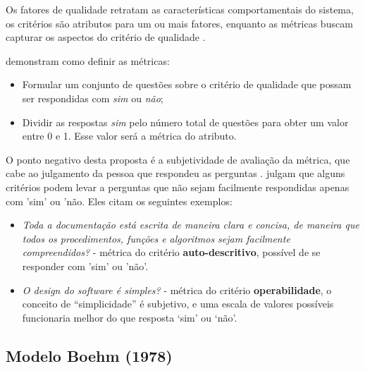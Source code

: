 \documentclass[
	12pt,				%
	openright,			%
	oneside,			%
	a4paper,			%
	english,			%
	brazil,				%
	]{abntex2}
\begin{document}
\begin{figure}[H]
    \label{fig:mcCall-quality_model}
\end{figure}

Os fatores de qualidade retratam as características comportamentais do sistema, os critérios são atributos para um ou mais fatores, enquanto as métricas buscam capturar os aspectos do critério de qualidade \cite{berander2005}.

 demonstram como definir as métricas:
\begin{itemize}
    \item Formular um conjunto de questões sobre o critério de qualidade que possam ser respondidas com \emph{sim} ou \emph{não};
    \item Dividir as respostas \emph{sim} pelo número total de questões para obter um valor entre 0 e 1. Esse valor será a métrica do atributo.
\end{itemize}

O ponto negativo desta proposta é a subjetividade de avaliação da métrica, que cabe ao julgamento da pessoa que respondeu as perguntas \cite{berander2005}.  julgam que alguns critérios podem levar a perguntas que não sejam facilmente respondidas apenas com 'sim' ou 'não. Eles citam os seguintes exemplos:
\begin{itemize}
    \item \emph{Toda a documentação está escrita de maneira clara e concisa, de maneira que todos os procedimentos, funções e algoritmos sejam facilmente compreendidos?} - métrica do critério \textbf{auto-descritivo}, possível de se responder com 'sim' ou 'não'.
    \item \emph{O design do software é simples?} - métrica do critério \textbf{operabilidade}, o conceito de ``simplicidade'' é subjetivo, e uma escala de valores possíveis funcionaria melhor do que resposta `sim' ou `não'.
\end{itemize}

\subsection{Modelo Boehm (1978)}
\end{document}
